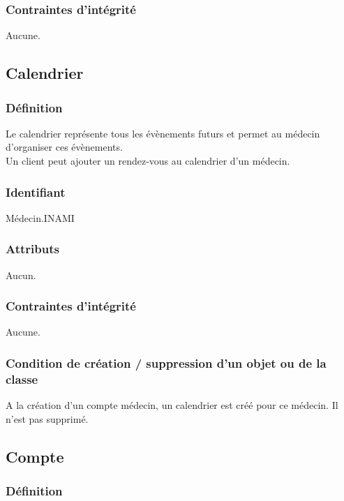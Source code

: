 \documentclass[a4paper, 11pt]{report}
\begin{document}
\subsubsection{Contraintes d'intégrité}

Aucune.

\subsection{Calendrier}

\subsubsection{Définition}

Le calendrier représente tous les évènements futurs et permet
au médecin d'organiser ces évènements. \\
Un client peut ajouter un rendez-vous au calendrier d'un médecin.

\subsubsection{Identifiant}

Médecin.INAMI

\subsubsection{Attributs}

Aucun.

\subsubsection{Contraintes d'intégrité}

Aucune.

\subsubsection{Condition de création / suppression d'un objet ou de la classe}

A la création d'un compte médecin, un calendrier est créé pour ce médecin. 
Il n'est pas supprimé.


\subsection{Compte}

\subsubsection{Définition}
\end{document}
